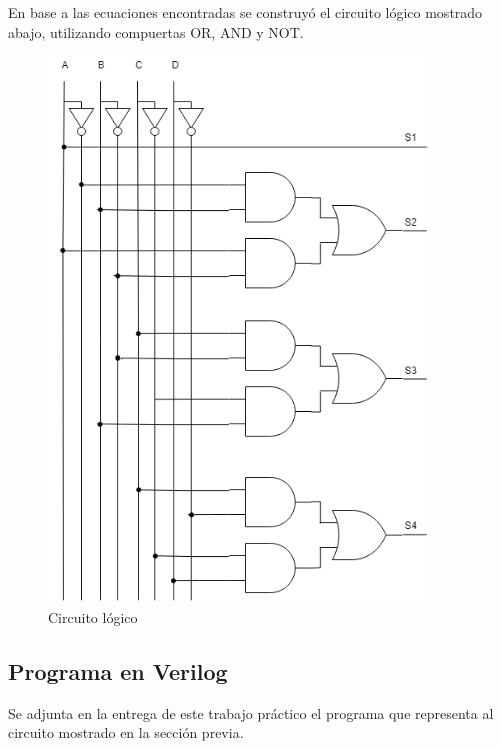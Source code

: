 En base a las ecuaciones encontradas se construy\'o el circuito l\'ogico mostrado abajo, utilizando compuertas \textsc{OR}, \textsc{AND} y \textsc{NOT}.

\begin{figure}[H]
    \centering
    \includegraphics[width=0.9\textwidth]{./EJ_4/EJ4_TP1_Electro3.png}
    \caption{Circuito l\'ogico}
\end{figure}

\subsection{Programa en Verilog}
Se adjunta en la entrega de este trabajo pr\'actico el programa que representa al circuito mostrado en la secci\'on previa. 